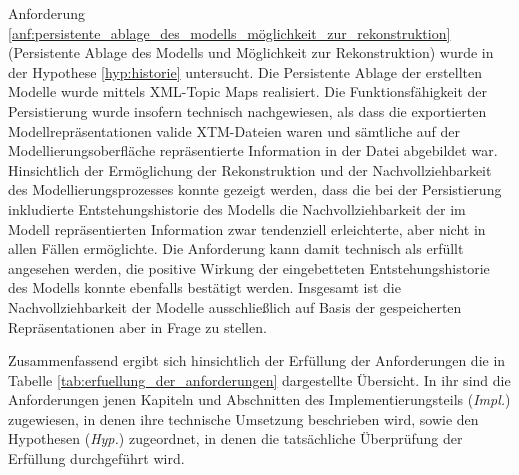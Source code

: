 Anforderung \ref{anf:persistente_ablage_des_modells_möglichkeit_zur_rekonstruktion} (Persistente Ablage des Modells und Möglichkeit zur Rekonstruktion) wurde in der Hypothese \ref{hyp:historie} untersucht. Die Persistente Ablage der erstellten Modelle wurde mittels XML-Topic Maps realisiert. Die Funktionsfähigkeit der Persistierung wurde insofern technisch nachgewiesen, als dass die exportierten Modellrepräsentationen valide \gls{XTM}-Dateien waren und sämtliche auf der Modellierungsoberfläche repräsentierte Information in der Datei abgebildet war. Hinsichtlich der Ermöglichung der Rekonstruktion und der Nachvollziehbarkeit des Modellierungsprozesses konnte gezeigt werden, dass die bei der Persistierung inkludierte Entstehungshistorie des Modells die Nachvollziehbarkeit der im Modell repräsentierten Information zwar tendenziell erleichterte, aber nicht in allen Fällen ermöglichte. Die Anforderung kann damit technisch als erfüllt angesehen werden, die positive Wirkung der eingebetteten Entstehungshistorie des Modells konnte ebenfalls bestätigt werden. Insgesamt ist die Nachvollziehbarkeit der Modelle ausschließlich auf Basis der gespeicherten Repräsentationen aber in Frage zu stellen.

Zusammenfassend ergibt sich hinsichtlich der Erfüllung der Anforderungen die in Tabelle \ref{tab:erfuellung_der_anforderungen} dargestellte Übersicht. In ihr sind die Anforderungen jenen Kapiteln und Abschnitten des Implementierungsteils (\emph{Impl.}) zugewiesen, in denen ihre technische Umsetzung beschrieben wird, sowie den Hypothesen (\emph{Hyp.}) zugeordnet, in denen die tatsächliche Überprüfung der Erfüllung durchgeführt wird.

